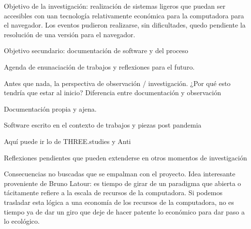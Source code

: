 



Objetivo de la investigación: realización de sistemas ligeros que puedan ser accesibles con uan tecnología relativamente económica para la computadora para el navegador. Los eventos pudieron realizarse, sin dificultades, quedo pendiente la resolución de una versión para el navegador. 

Objetivo secundario: documentación de software y del proceso 

Agenda de enunaciación de trabajos y reflexiones para el futuro.

Antes que nada, la perspectiva de observación / investigación. ¿Por qué esto tendría que estar al inicio? Diferencia entre documentación y observación 

Documentación propia y ajena. 

Software escrito en el contexto de trabajos y piezas post pandemia

Aquí puede ir lo de THREE.studies y Anti 

Reflexiones pendientes que pueden extenderse en otros momentos de investigación 

Consecuencias no buscadas que se empalman con el proyecto. Idea interesante proveniente de Bruno Latour: es tiempo de girar de un paradigma que abierta o tácitamente refiere a la escala de recursos de la computadora. Si podemos trasladar esta lógica a una economía de los recursos de la computadora, no es tiempo ya de dar un giro que deje de hacer patente lo económico para dar paso a lo ecológico. 


